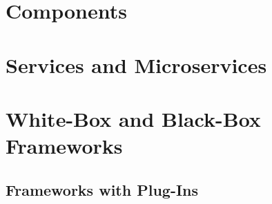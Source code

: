 

\subtitle{6. Techniques for Application Software}
\author{Timo Kehrer}





\section{Components}



\lessonslearned{
	\item \ldots
}{
	\item \ldots
}{
	\item \ldots
}

\sectionend

\section{Services and Microservices}



\lessonslearned{
	\item \ldots
}{
	\item \ldots
}{
	\item \ldots
}

\sectionend

\section{White-Box and Black-Box Frameworks}

\subsection{Frameworks with Plug-Ins}
\begin{frame}{\insertsubsection\ \mytitlesource{\featureide}}
\end{frame}


\lessonslearned{
	\item \ldots
}{
	\item \ldots
}{
	\item \ldots
}




